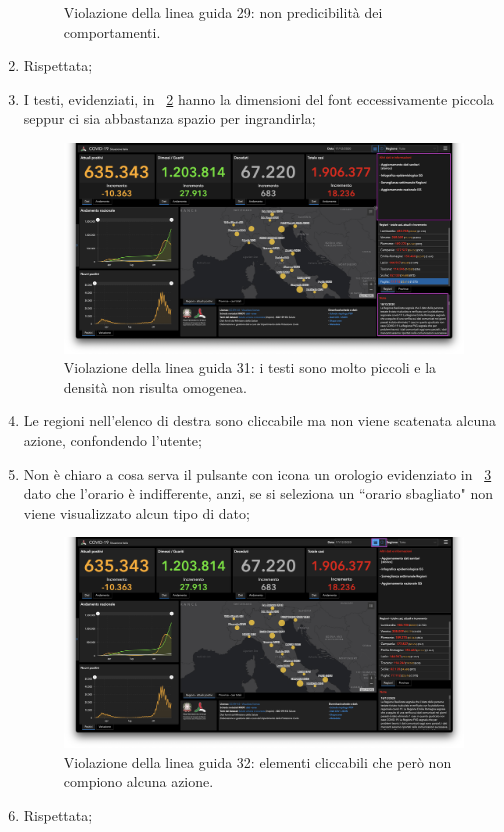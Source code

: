 \begin{enumerate}
\begin{figure}[H]
            \caption{Violazione della linea guida 29: non predicibilità dei comportamenti.}
            \label{fig:guidelines-violations-10}
        \end{figure}
    \item Rispettata;
    \item I testi, evidenziati, in ~\ref{fig:guidelines-violations-11} hanno la dimensioni del font eccessivamente piccola seppur ci sia abbastanza spazio per ingrandirla;
        \begin{figure}[H]
            \centering
            \includegraphics[width=0.5\columnwidth]{../../../assets/images/verifica-risorse-esistenti/guidelines_violations_13}
            \caption{Violazione della linea guida 31: i testi sono molto piccoli e la densità non risulta omogenea.}
            \label{fig:guidelines-violations-11}
        \end{figure}
    \item Le regioni nell'elenco di destra sono cliccabile ma non viene scatenata alcuna azione, confondendo l'utente;
    \item Non è chiaro a cosa serva il pulsante con icona un orologio evidenziato in ~\ref{fig:guidelines-violations-12} dato che l'orario è indifferente, anzi, se si seleziona un ``orario sbagliato" non viene visualizzato alcun tipo di dato;
        \begin{figure}[H]
            \centering
            \includegraphics[width=0.5\columnwidth]{../../../assets/images/verifica-risorse-esistenti/guidelines_violations_14}
            \caption{Violazione della linea guida 32: elementi cliccabili che però non compiono alcuna azione.}
            \label{fig:guidelines-violations-12}
        \end{figure}
    \item Rispettata;

\end{enumerate}
